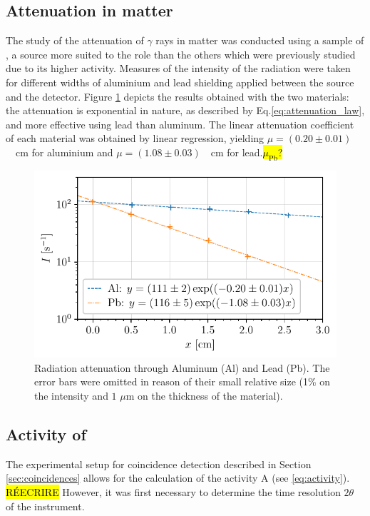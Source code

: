 \subsection{Attenuation in matter}
The study of the attenuation of $\gamma$ rays in matter was conducted using 
a sample of \cesium, a source more suited to the role than 
the others which were previously studied due to its higher activity\footnotemark.
Measures of the intensity of the radiation were taken for
different widths of aluminium and lead shielding applied 
between the source and the detector.
Figure \ref{fig:attenuation_coefficient} depicts the results obtained with 
the two materials:
the attenuation is exponential in nature, as described 
by Eq.\eqref{eq:attenuation_law}, and more effective using lead than aluminum.
The linear attenuation coefficient of each material was obtained by linear regression, yielding \mbox{$\mu = (0.20 \pm 0.01)$ \unit{\per\cm}} for aluminium
and \mbox{$\mu = (1.08 \pm 0.03)$ \unit{\per\cm}} for lead.\hl{$\mu_{\mathrm{Pb}}$?}
\begin{figure}[htbp]
    \centering
    \includegraphics[scale=1]{figures/attenuation_coefficient.pdf}
    \caption{Radiation attenuation through Aluminum (Al) and Lead (Pb). 
             The error bars were omitted in reason of their small relative size 
             (1\% on the intensity and $1$ $\mu$m on the thickness of the material).}
    \label{fig:attenuation_coefficient}
\end{figure}

\subsection{Activity of \cobalt}
The experimental setup for coincidence detection described in Section \ref{sec:coincidences} allows for the calculation
of the activity A (see \autoref{eq:activity}). \hl{RÉECRIRE}
However, it was first necessary to determine the time resolution $2\theta$ of 
the instrument.

